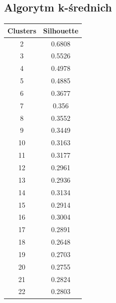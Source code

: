 \documentclass{classrep}
\begin{document}
    \label{results} {

        \subsection{Algorytm k-średnich}
        \label{result_1} {

            \begin{table}[!htbp]

                \begin{minipage}{.24\textwidth}
                    \centering
                    \begin{tabular}{|c|c|}
                        \hline
                        Clusters & Silhouette \\ \hline
                        2 & 0.6808 \\ \hline
                        3 & 0.5526 \\ \hline
                        4 & 0.4978 \\ \hline
                        5 & 0.4885 \\ \hline
                        6 & 0.3677 \\ \hline
                        7 & 0.356 \\ \hline
                        8 & 0.3552 \\ \hline
                        9 & 0.3449 \\ \hline
                        10 & 0.3163 \\ \hline
                        11 & 0.3177 \\ \hline
                        12 & 0.2961 \\ \hline
                        13 & 0.2936 \\ \hline
                        14 & 0.3134 \\ \hline
                        15 & 0.2914 \\ \hline
                        16 & 0.3004 \\ \hline
                        17 & 0.2891 \\ \hline
                        18 & 0.2648 \\ \hline
                        19 & 0.2703 \\ \hline
                        20 & 0.2755 \\ \hline
                        21 & 0.2824 \\ \hline
                        22 & 0.2803 \\ \hline

\end{tabular}
\end{minipage}
\end{table}}}
\end{document}
